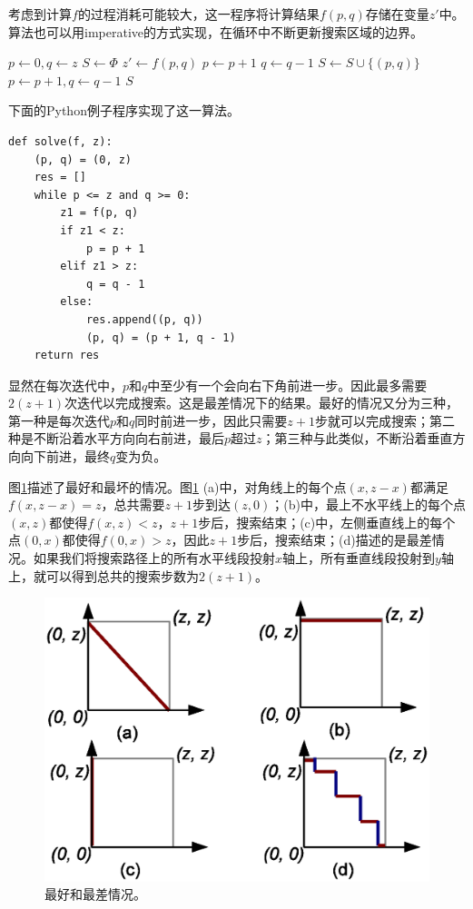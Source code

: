 \documentclass[UTF8]{article}
\begin{document}
考虑到计算$f$的过程消耗可能较大，这一程序将计算结果$f(p, q)$存储在变量$z'$中。算法也可以用imperative的方式实现，在循环中不断更新搜索区域的边界。

\begin{algorithmic}[1]
  \State $p \gets 0, q \gets z$
  \State $S \gets \Phi$
    \State $z' \gets f(p, q)$
      \State $p \gets p + 1$
      \State $q \gets q - 1$
    \Else
      \State $S \gets S \cup \{(p, q)\}$
      \State $p \gets p + 1, q \gets q - 1$
    \EndIf
  \EndWhile
  \State \Return $S$
\EndFunction
\end{algorithmic}

下面的Python例子程序实现了这一算法。

\lstset{language=Python}
\begin{lstlisting}
def solve(f, z):
    (p, q) = (0, z)
    res = []
    while p <= z and q >= 0:
        z1 = f(p, q)
        if z1 < z:
            p = p + 1
        elif z1 > z:
            q = q - 1
        else:
            res.append((p, q))
            (p, q) = (p + 1, q - 1)
    return res

\end{lstlisting}

显然在每次迭代中，$p$和$q$中至少有一个会向右下角前进一步。因此最多需要$2(z+1)$次迭代以完成搜索。这是最差情况下的结果。最好的情况又分为三种，第一种是每次迭代$p$和$q$同时前进一步，因此只需要$z+1$步就可以完成搜索；第二种是不断沿着水平方向向右前进，最后$p$超过$z$；第三种与此类似，不断沿着垂直方向向下前进，最终$q$变为负。

图\ref{fig:saddleback-1-cases}描述了最好和最坏的情况。图\ref{fig:saddleback-1-cases} (a)中，对角线上的每个点$(x, z-x)$都满足$f(x, z-x) = z$，总共需要$z+1$步到达$(z, 0)$；(b)中，最上不水平线上的每个点$(x, z)$都使得$f(x, z) < z$，$z+1$步后，搜索结束；(c)中，左侧垂直线上的每个点$(0, x)$都使得$f(0, x) > z$，因此$z+1$步后，搜索结束；(d)描述的是最差情况。如果我们将搜索路径上的所有水平线段投射$x$轴上，所有垂直线段投射到$y$轴上，就可以得到总共的搜索步数为$2(z+1)$。

\begin{figure}[htbp]
 \centering
 \includegraphics[scale=0.5]{img/saddleback-1-cases.eps}
 \caption{最好和最差情况。}
 \label{fig:saddleback-1-cases}
\end{figure}
\end{document}
